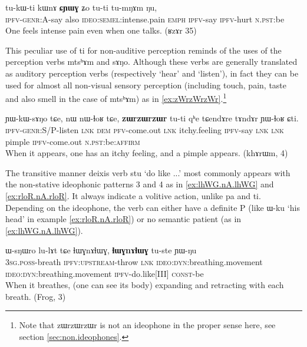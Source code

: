\documentclass[oldfontcommands,oneside,a4paper,11pt]{article}
\newcommand{\ipa}[1]{{\phon \mbox{#1}}} %
\begin{document}
\begin{exe}
\ex \label{ex:CYWG.Zo}
\gll
\ipa{tu-kɯ-ti} 	\ipa{kɯnɤ} 	\ipa{\textbf{ɕɲɯɣ}} 	\ipa{ʑo} 	\ipa{tu-ti} 	\ipa{tu-mŋɤm} 	\ipa{ŋu,} \\
\textsc{ipfv-genr:A}-say also \textsc{ideo:semel}:intense.pain \textsc{emph} \textsc{ipfv}-say \textsc{ipfv}-hurt \textsc{n.pst}:be \\
\glt One feels intense pain even when one talks. (ʁzɤr 35)
\end{exe}

This peculiar use of \ipa{ti} for non-auditive perception reminds of the uses of the perception verbs  \ipa{mtsʰɤm} and \ipa{sɤŋo}. Although these verbs are generally translated as auditory perception verbs (respectively `hear' and `listen'), in fact they    can be used for almost all  non-visual sensory perception (including touch, pain, taste and also smell in the case of    \ipa{mtsʰɤm}) as in \ref{ex:zWrzWrzWr}.\footnote{Note that \ipa{zɯrzɯrzɯr}  is not an ideophone in the proper sense here, see section \ref{sec:non.ideophones}. }
 
\begin{exe}
\ex \label{ex:zWrzWrzWr}
\gll
\ipa{ɲɯ-kɯ-sɤŋo} 	\ipa{tɕe,} 	\ipa{nɯ} 	\ipa{nɯ-ɬoʁ} 	\ipa{tɕe,} 	\ipa{\textbf{zɯrzɯrzɯr}} 	\ipa{tu-ti} 	\ipa{qʰe} 	\ipa{tɕendɤre} 	\ipa{tɤndɤr} 	\ipa{ɲɯ-ɬoʁ} 	\ipa{ɕti.} 	\\
\textsc{ipfv-genr}:S/P-listen \textsc{lnk} \textsc{dem} \textsc{pfv}-come.out \textsc{lnk} itchy.feeling \textsc{ipfv}-say \textsc{lnk}  \textsc{lnk} pimple \textsc{ipfv}-come.out \textsc{n.pst:}be:\textsc{affirm} \\
\glt When it appears, one has an itchy feeling, and a pimple appears. (khɤrɯm, 4)
\end{exe}

The transitive manner deixis verb \ipa{stu} `do like ...' most commonly appears with the non-stative ideophonic patterns 3 and 4 as in \ref{ex:lhWG.nA.lhWG} and \ref{ex:rloR.nA.rloR}. It always indicate a volitive action, unlike \ipa{pa} and \ipa{ti}. Depending on the ideophone, the verb can either have a definite P (like \ipa{ɯ-ku} `his head' in example \ref{ex:rloR.nA.rloR}) or no semantic patient (as in \ref{ex:lhWG.nA.lhWG}).

\begin{exe}
\ex \label{ex:lhWG.nA.lhWG}
\gll
\ipa{ɯ-sŋɯro} 	\ipa{lu-lɤt} 	\ipa{tɕe} 	\ipa{ɬɯɣnɤɬɯɣ,} 	\ipa{\textbf{ɬɯɣnɤɬɯɣ}} 	\ipa{tu-ste} 	\ipa{ɲɯ-ŋu} \\
\textsc{3sg.poss}-breath \textsc{ipfv:upstream}-throw \textsc{lnk} \textsc{ideo:dyn}:breathing.movement \textsc{ideo:dyn}:breathing.movement \textsc{ipfv}-do.like[III] \textsc{const}-be \\
\glt When it breathes, (one can see its body) expanding and retracting with each breath. (Frog, 3)
\end{exe}
\end{document}
